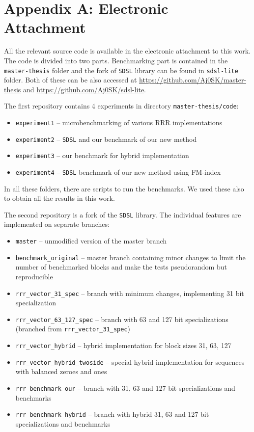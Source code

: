 \chapter*{Appendix A: Electronic Attachment}
\label{kap:kapAppendixA}

All the relevant source code is available in the electronic attachment to this work.
The code is divided into two parts. Benchmarking part is contained in the \verb!master-thesis!
folder and the fork of \texttt{SDSL} library can be found in \verb!sdsl-lite! folder.
Both of these can be also accessed at \url{https://github.com/Aj0SK/master-thesis} and
\url{https://github.com/Aj0SK/sdsl-lite}.

The first repository contains 4 experiments in directory \texttt{master-thesis/code}:
\begin{itemize}
    \item \texttt{experiment1} -- microbenchmarking of various RRR implementations
    \item \texttt{experiment2} -- \texttt{SDSL} and our benchmark of our new method
    \item \texttt{experiment3} -- our benchmark for hybrid implementation
    \item \texttt{experiment4} -- \texttt{SDSL} benchmark of our new method using FM-index
\end{itemize}
In all these folders, there are scripts to run the benchmarks. We used these also to obtain
all the results in this work. 

The second repository is a fork of the \texttt{SDSL} library. The individual features are implemented
on separate branches:
\begin{itemize}
    \item \texttt{master} -- unmodified version of the master branch
    \item \texttt{benchmark\_original} -- master branch containing minor changes
        to limit the number of benchmarked blocks and make the tests pseudorandom but reproducible
    \item \texttt{rrr\_vector\_31\_spec} -- branch with minimum changes, implementing 31 bit specialization
    \item \texttt{rrr\_vector\_63\_127\_spec} -- branch with 63 and 127 bit specializations (branched from \texttt{rrr\_vector\_31\_spec})
    \item \texttt{rrr\_vector\_hybrid} -- hybrid implementation for block sizes 31, 63, 127
    \item \texttt{rrr\_vector\_hybrid\_twoside} -- special hybrid implementation for sequences with balanced zeroes and ones
    \item \texttt{rrr\_benchmark\_our} -- branch with 31, 63 and 127 bit specializations and benchmarks
    \item \texttt{rrr\_benchmark\_hybrid} -- branch with hybrid 31, 63 and 127 bit specializations and benchmarks
\end{itemize}

